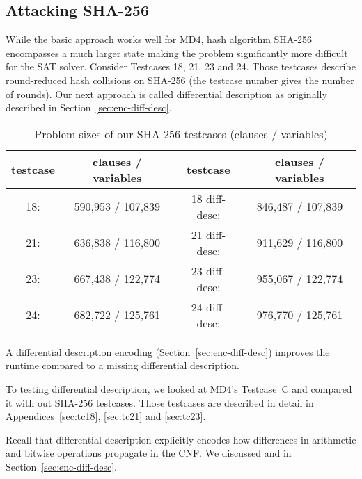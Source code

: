 \subsection{Attacking SHA-256}
\label{sec:result-diff-desc}
%
While the basic approach works well for MD4, hash algorithm SHA-256 encompasses
a much larger state making the problem significantly more difficult for the SAT solver.
Consider Testcases 18, 21, 23 and 24. Those testcases describe
round-reduced hash collisions on SHA-256 (the testcase number gives
the number of rounds). Our next approach is called differential description
as originally described in Section~\ref{sec:enc-diff-desc}. 

\begin{table}[!h]
  \begin{center}
    \begin{tabular}{cc|cc}
        \textbf{testcase} & \textbf{clauses / variables} & \textbf{testcase} & \textbf{clauses / variables} \\
      \hline
        18: & 590,953 / 107,839 & 18 diff-desc: & 846,487 / 107,839 \\
        21: & 636,838 / 116,800 & 21 diff-desc: & 911,629 / 116,800 \\
        23: & 667,438 / 122,774 & 23 diff-desc: & 955,067 / 122,774 \\
        24: & 682,722 / 125,761 & 24 diff-desc: & 976,770 / 125,761 \\
    \end{tabular}
    \caption{Problem sizes of our SHA-256 testcases (clauses / variables)}
    \label{tab:problem-sizes}
  \end{center}
\end{table}

\begin{prop}
  A differential description encoding (Section~\ref{sec:enc-diff-desc})
  improves the runtime compared to a missing differential description.
\end{prop}

To testing differential description, we looked at MD4's Testcase~C
and compared it with out SHA-256 testcases. Those testcases
are described in detail in Appendices~\ref{sec:tc18}, \ref{sec:tc21}
and \ref{sec:tc23}.

Recall that differential description explicitly encodes
how differences in arithmetic and bitwise operations propagate in the CNF.
We discussed  and  in Section~\ref{sec:enc-diff-desc}.

